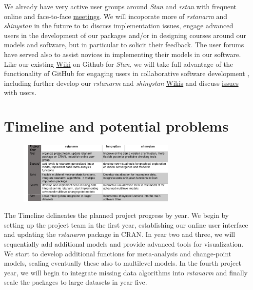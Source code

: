 \documentclass[11pt,notitlepage]{article}
\begin{document}
We already have very active \href{https://groups.google.com/forum/#!forum/stan-users} {user groups} around \textit{Stan} and 
\textit{rstan}  with frequent online and face-to-face \href{http://www.meetup.com/bda-group/}{meetings}. We will incoporate more of
\textit{rstanarm} and \textit{shinystan} in the future to to discuss implementation issues, engage advanced users in the development of 
our packages and/or in designing courses around our models and software, but in particular to solicit their feedback. The user 
forums have served also to assist novices in implementing their models in our software.
Like our existing \href{https://github.com/stan-dev/example-models/wiki}{Wiki} on Github for \textit{Stan}, we will 
take full advantage of the functionality of GitHub for engaging users in collaborative software development \cite{loeliger2012version}, 
including further develop our \textit{rstanarm} and \textit{shinystan} 
\href{https://github.com/stan-dev/rstanarm/wiki}{Wikis} and discuss \href{https://github.com/stan-dev/rstanarm/issues}{issues} with users.

\section*{Timeline and potential problems}

\begin{figure} %
 \vspace*{-12pt}
    \centering
  \includegraphics[width=0.7\textwidth]{Figures/Timeline.pdf}
 \vspace*{-15pt}
\end{figure}

The Timeline delineates the planned project progress by year. We begin by setting up the project team in the first year, 
establishing our online user interface and updating the \textit{rstanarm} package in CRAN. In year two and three, we will sequentially 
add additional models and provide advanced tools for visualization. We start to develop additional functions for meta-analysis and 
change-point models, scaling eventually these also to multilevel models. In the fourth project year, we will begin to integrate 
missing data algorithms into \textit{rstanarm} and finally scale the packages to large datasets in year five.
\end{document}

